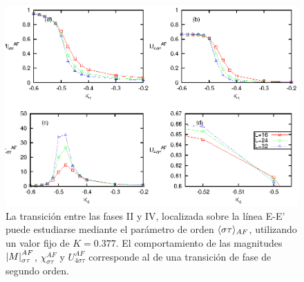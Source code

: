\begin{figure}[h!]
\begin{center}
\includegraphics[scale=0.8]{graf/phases/new_multi_AT_II_IV_b.eps}
\end{center}
\caption{La transición entre las fases II y IV, localizada sobre la línea E-E'
 puede estudiarse mediante el parámetro de orden $\langle \sigma\tau \rangle_{AF}$, utilizando un valor fijo de $K=0.377$.
 El comportamiento de las magnitudes $\left\vert M\right\vert_{\sigma\tau}^{AF}$, $\chi_{\sigma\tau}^{AF}$ y $U_{4\sigma\tau}^{AF}$
 corresponde al de una transici\'on de fase de segundo orden.}
\label{fig:multi_AT_II_IV_b}
\end{figure}

